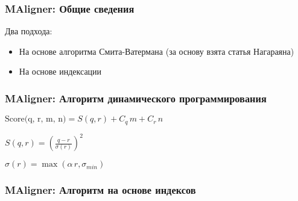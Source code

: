\begin{frame}
\frametitle{MAligner: Общие сведения}
Два подхода:
\begin{itemize}
  \item На основе алгоритма Смита-Ватермана (за основу взята статья Нагараяна)
  \item На основе индексации
\end{itemize}
\end{frame}

\begin{frame}
\frametitle{MAligner: Алгоритм динамического программирования}


$\text{Score(q, r, m, n)} = S(q, r) + C_q \,m + C_r \, n$

$S(q, r) = (\frac{q - r}{\sigma(r)})^2$

$\sigma(r) = \max(\alpha \, r, \sigma_{min})$

\end{frame}

\begin{frame}
\frametitle{MAligner: Алгоритм на основе индексов}

\end{frame}
